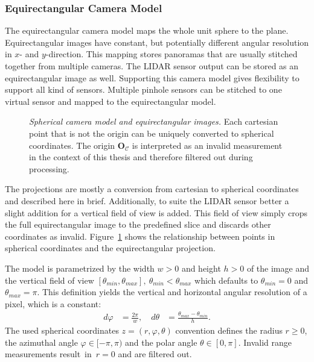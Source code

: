 \subsubsection{Equirectangular Camera Model}

The equirectangular camera model maps the whole unit sphere to the plane\cite[p. 90]{snyder_1987}.
Equirectangular images have constant, but potentially different angular resolution in $x$- and $y$-direction.
This mapping stores panoramas that are usually stitched together from multiple cameras.
The \acrshort{LIDAR} sensor output can be stored as an equirectangular image as well.
Supporting this camera model gives flexibility to support all kind of sensors.
Multiple pinhole sensors can be stitched to one virtual sensor and mapped to the equirectangular model.
\begin{figure}[b!]
    \scalebox{0.9}{%
    
    }
    \caption[Spherical camera model and equirectangular images]{\emph{Spherical camera model and equirectangular images.} Each cartesian point that is not the origin can be uniquely converted to spherical coordinates. The origin $\mathbf{O_\mathcal{C}}$ is interpreted as an invalid measurement in the context of this thesis and therefore filtered out during processing.}\label{fig:spherical}
\end{figure}
The projections are mostly a conversion from cartesian to spherical coordinates and described here in brief.
Additionally, to suite the \acrshort{LIDAR} sensor better a slight addition for a vertical field of view is added.
This field of view simply crops the full equirectangular image to the predefined slice and discards other coordinates as invalid.
Figure~\ref{fig:spherical} shows the relationship between points in spherical coordinates and the equirectangular projection.

The model is parametrized by the width $w > 0$ and height $h > 0$ of the image and the vertical field of view $[\theta_{min}, \theta_{max}],~\theta_{min} < \theta_{max}$ which defaults to $\theta_{min} = 0$ and $\theta_{max} = \pi$.
This definition yields the vertical and horizontal angular resolution of a pixel, which is a constant:
\begin{equation}
\label{eq:equi_angular_resolution}
\begin{aligned}
    d\varphi &= \frac{2 \pi}{w}, \quad
    d\theta &= \frac{\theta_{max} - \theta_{min}}{h} \text{.}
\end{aligned}
\end{equation}
The used spherical coordinates $z = (r, \varphi, \theta)$ convention defines the radius $r \ge 0$, the azimuthal angle $\varphi \in [-\pi, \pi)$ and the polar angle $\theta \in [0, \pi]$.
Invalid range measurements result~in~$r = 0$ and are filtered out.

